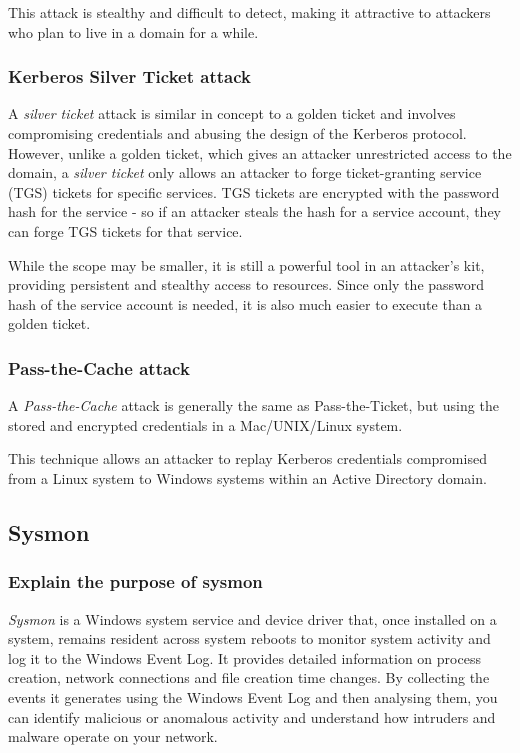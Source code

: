 This attack is stealthy and difficult to detect, making it attractive to attackers who plan to live in a domain for a while.

\subsubsection{Kerberos Silver Ticket attack}
A \textit{silver ticket} attack is similar in concept to a golden ticket and involves compromising credentials and abusing the design of the Kerberos protocol. However, unlike a golden ticket, which gives an attacker unrestricted access to the domain, a \textit{silver ticket} only allows an attacker to forge ticket-granting service (TGS) tickets for specific services. TGS tickets are encrypted with the password hash for the service - so if an attacker steals the hash for a service account, they can forge TGS tickets for that service.

While the scope may be smaller, it is still a powerful tool in an attacker's kit, providing persistent and stealthy access to resources. Since only the password hash of the service account is needed, it is also much easier to execute than a golden ticket.

\subsubsection{Pass-the-Cache attack}
A \textit{Pass-the-Cache} attack is generally the same as Pass-the-Ticket, but using the stored and encrypted credentials in a Mac/UNIX/Linux system.

This technique allows an attacker to replay Kerberos credentials compromised from a Linux system to Windows systems within an Active Directory domain.

\newpage

\subsection{Sysmon}

\subsubsection{Explain the purpose of sysmon}
\textit{Sysmon} is a Windows system service and device driver that, once installed on a system, remains resident across system reboots to monitor system activity and log it to the Windows Event Log. It provides detailed information on process creation, network connections and file creation time changes. By collecting the events it generates using the Windows Event Log and then analysing them, you can identify malicious or anomalous activity and understand how intruders and malware operate on your network.

